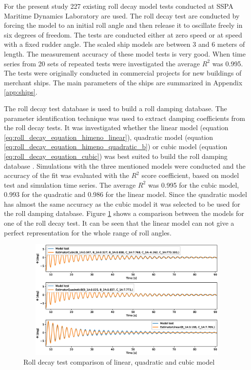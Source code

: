 For the present study 227 existing roll decay model tests conducted at SSPA Maritime Dynamics Laboratory are used. The roll decay test are conducted by forcing the model to an initial roll angle and then release it to oscillate freely in six degrees of freedom. The tests are conducted either  at zero speed or at speed with a fixed rudder angle. The scaled ship models are between 3 and 6 meters of length. The measurement accuracy of these model tests is very good. When time series from 20 sets of repeated tests were investigated the average $R^2$ was 0.995. The tests were originally conducted in commercial projects for new buildings of merchant ships. The main parameters of the ships are summarized in Appendix \ref{app:ships}. 

The roll decay test database is used to build a roll damping database. The parameter identification technique was used to extract damping coefficients from the roll decay tests. It was investigated whether the linear model (equation \ref{eq:roll_decay_equation_himeno_linear}), quadratic model (equation \ref{eq:roll_decay_equation_himeno_quadratic_b}) or cubic model (equation \ref{eq:roll_decay_equation_cubic}) was best suited  to build the roll damping database . Simulations with the three mentioned models were conducted and the accuracy of the fit was evaluated with the $R^2$ score coefficient, based on model test and simulation time series.
The average $R^2$ was 0.995 for the cubic model, 0.993 for the quadratic and 0.986 for the linear model. Since the quadratic model has almost the same accuracy as the cubic model it was selected to be used for the roll damping database. Figure \ref{fig:roll_decay_model_compare} shows a comparison between the models for one of the roll decay test. It can be seen that the linear model can not give a perfect representation for the whole range of roll angles.

\begin{figure}[H]
    \centering
    \includegraphics[width=12cm, height = 6cm ]{figures/roll_decay_model_compare.eps}
    \caption{Roll decay test comparison of linear, quadratic and cubic model}
    \label{fig:roll_decay_model_compare}
\end{figure}


